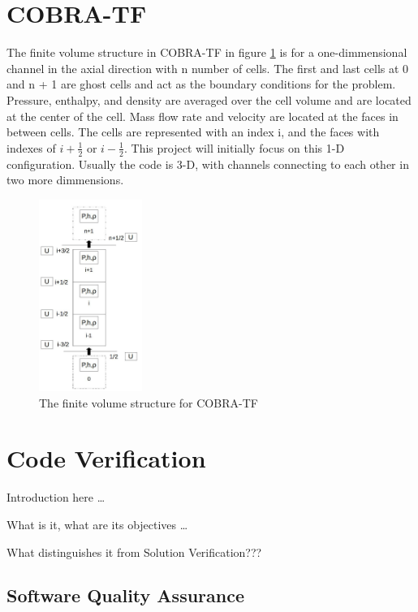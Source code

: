 \documentclass{mc2015}
\begin{document}
\section{COBRA-TF}

The finite volume structure in COBRA-TF in figure \ref{fig:CTF-Cells} is for a
one-dimmensional channel in the axial direction with n number of cells. The
first and last cells at 0 and n + 1 are ghost cells and act as the boundary
conditions for the problem. Pressure, enthalpy, and density are averaged over
the cell volume and are located at the center of the cell. Mass flow rate and
velocity are located at the faces in between cells. The cells  are represented
with an index i, and the faces with indexes of $i + \frac{1}{2}$ or 
$i-\frac{1}{2}$. This project will initially focus on this 1-D configuration.
Usually the code  is 3-D,  with channels connecting to each other in two more 
dimmensions.

\begin{figure}[!h]
	\centering
	\includegraphics[width=0.30\textwidth]{images/CTF-Cells}
	\caption{The finite volume structure for COBRA-TF}
	\label{fig:CTF-Cells}
\end{figure}

\section{Code Verification}

Introduction here \ldots

What is it, what are its objectives \ldots

What distinguishes it from Solution Verification???

\subsection{Software Quality Assurance}
\end{document}
